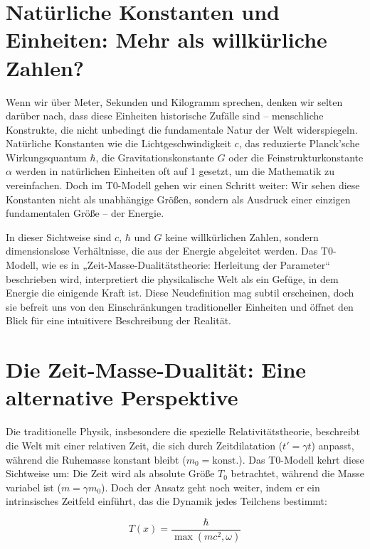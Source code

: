 \documentclass[a4paper,12pt]{article}
\newcommand{\Tfield}{T(x)}
\begin{document}
	\section{Natürliche Konstanten und Einheiten: Mehr als willkürliche Zahlen?}
	
	Wenn wir über Meter, Sekunden und Kilogramm sprechen, denken wir selten darüber nach, dass diese Einheiten historische Zufälle sind – menschliche Konstrukte, die nicht unbedingt die fundamentale Natur der Welt widerspiegeln. Natürliche Konstanten wie die Lichtgeschwindigkeit \(c\), das reduzierte Planck’sche Wirkungsquantum \(\hbar\), die Gravitationskonstante \(G\) oder die Feinstrukturkonstante \(\alpha\) werden in natürlichen Einheiten oft auf 1 gesetzt, um die Mathematik zu vereinfachen. Doch im T0-Modell gehen wir einen Schritt weiter: Wir sehen diese Konstanten nicht als unabhängige Größen, sondern als Ausdruck einer einzigen fundamentalen Größe – der Energie.
	
	In dieser Sichtweise sind \(c\), \(\hbar\) und \(G\) keine willkürlichen Zahlen, sondern dimensionslose Verhältnisse, die aus der Energie abgeleitet werden. Das T0-Modell, wie es in „Zeit-Masse-Dualitätstheorie: Herleitung der Parameter“ \cite{pascher_params_2025} beschrieben wird, interpretiert die physikalische Welt als ein Gefüge, in dem Energie die einigende Kraft ist. Diese Neudefinition mag subtil erscheinen, doch sie befreit uns von den Einschränkungen traditioneller Einheiten und öffnet den Blick für eine intuitivere Beschreibung der Realität.
	
	\section{Die Zeit-Masse-Dualität: Eine alternative Perspektive}
	
	Die traditionelle Physik, insbesondere die spezielle Relativitätstheorie, beschreibt die Welt mit einer relativen Zeit, die sich durch Zeitdilatation (\(t' = \gamma t\)) anpasst, während die Ruhemasse konstant bleibt (\(m_0 = \text{konst.}\)). Das T0-Modell kehrt diese Sichtweise um: Die Zeit wird als absolute Größe \(T_0\) betrachtet, während die Masse variabel ist (\(m = \gamma m_0\)). Doch der Ansatz geht noch weiter, indem er ein intrinsisches Zeitfeld einführt, das die Dynamik jedes Teilchens bestimmt:
	
	\begin{equation}
		\Tfield = \frac{\hbar}{\max(m c^2, \omega)}
	\end{equation}
	
\end{document}
